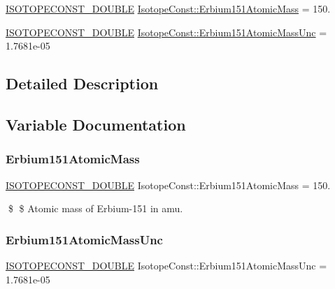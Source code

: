 \begin{DoxyCompactItemize}
\item 
\mbox{\hyperlink{group___isotope_const-_macros_ga8f45a7272ce02c0b4c65c44636ed719a}{I\+S\+O\+T\+O\+P\+E\+C\+O\+N\+S\+T\+\_\+\+D\+O\+U\+B\+LE}} \mbox{\hyperlink{group___isotope_const-_erbium-_er151_ga25cd3fba5695651913d4a2c932ab6e77}{Isotope\+Const\+::\+Erbium151\+Atomic\+Mass}} = 150.
\item 
\mbox{\hyperlink{group___isotope_const-_macros_ga8f45a7272ce02c0b4c65c44636ed719a}{I\+S\+O\+T\+O\+P\+E\+C\+O\+N\+S\+T\+\_\+\+D\+O\+U\+B\+LE}} \mbox{\hyperlink{group___isotope_const-_erbium-_er151_gacda6a0780f895548f254f911db85056a}{Isotope\+Const\+::\+Erbium151\+Atomic\+Mass\+Unc}} = 1.\+7681e-\/05
\end{DoxyCompactItemize}


\subsection{Detailed Description}


\subsection{Variable Documentation}
\mbox{\label{group___isotope_const-_erbium-_er151_ga25cd3fba5695651913d4a2c932ab6e77}} 
\subsubsection{\texorpdfstring{Erbium151\+Atomic\+Mass}{Erbium151AtomicMass}}
{\footnotesize\ttfamily \mbox{\hyperlink{group___isotope_const-_macros_ga8f45a7272ce02c0b4c65c44636ed719a}{I\+S\+O\+T\+O\+P\+E\+C\+O\+N\+S\+T\+\_\+\+D\+O\+U\+B\+LE}} Isotope\+Const\+::\+Erbium151\+Atomic\+Mass = 150.}

\$ \$ Atomic mass of Erbium-\/151 in amu. \mbox{\label{group___isotope_const-_erbium-_er151_gacda6a0780f895548f254f911db85056a}} 
\subsubsection{\texorpdfstring{Erbium151\+Atomic\+Mass\+Unc}{Erbium151AtomicMassUnc}}
{\footnotesize\ttfamily \mbox{\hyperlink{group___isotope_const-_macros_ga8f45a7272ce02c0b4c65c44636ed719a}{I\+S\+O\+T\+O\+P\+E\+C\+O\+N\+S\+T\+\_\+\+D\+O\+U\+B\+LE}} Isotope\+Const\+::\+Erbium151\+Atomic\+Mass\+Unc = 1.\+7681e-\/05}

